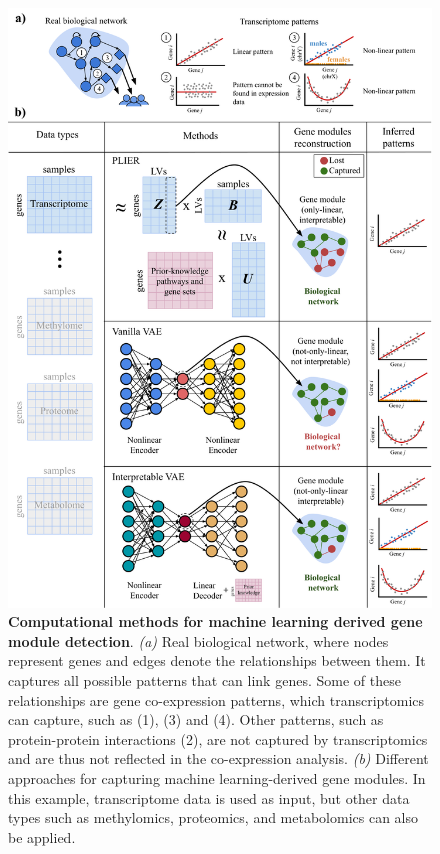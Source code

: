 \begin{figure}
\hypertarget{fig:fig3}{%
\centering
\includegraphics[width=1\textwidth,height=\textheight]{images/fig3.svg}
\caption{\textbf{Computational methods for machine learning derived gene module detection}.
\emph{(a)} Real biological network, where nodes represent genes and edges denote the relationships between them.
It captures all possible patterns that can link genes.
Some of these relationships are gene co-expression patterns, which transcriptomics can capture, such as (1), (3) and (4).
Other patterns, such as protein-protein interactions (2), are not captured by transcriptomics and are thus not reflected in the co-expression analysis.
\emph{(b)} Different approaches for capturing machine learning-derived gene modules.
In this example, transcriptome data is used as input, but other data types such as methylomics, proteomics, and metabolomics can also be applied.
}}
\end{figure}
